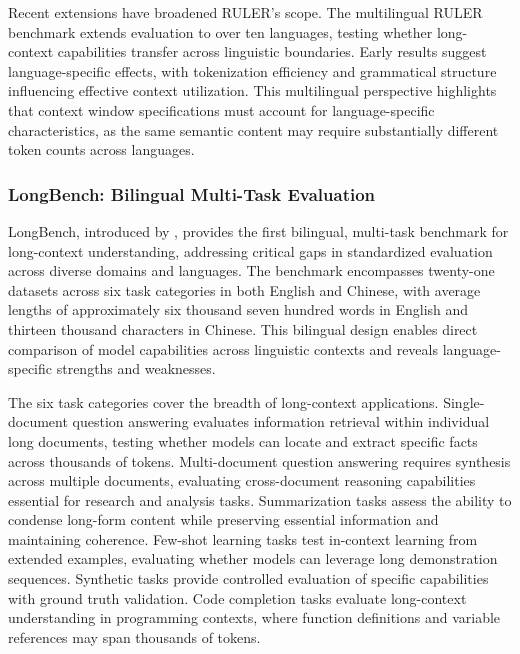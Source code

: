 Recent extensions have broadened RULER's scope. The multilingual RULER benchmark extends evaluation to over ten languages, testing whether long-context capabilities transfer across linguistic boundaries. Early results suggest language-specific effects, with tokenization efficiency and grammatical structure influencing effective context utilization. This multilingual perspective highlights that context window specifications must account for language-specific characteristics, as the same semantic content may require substantially different token counts across languages.

\subsubsection{LongBench: Bilingual Multi-Task Evaluation}

LongBench, introduced by \citet{bai2024longbench}, provides the first bilingual, multi-task benchmark for long-context understanding, addressing critical gaps in standardized evaluation across diverse domains and languages. The benchmark encompasses twenty-one datasets across six task categories in both English and Chinese, with average lengths of approximately six thousand seven hundred words in English and thirteen thousand characters in Chinese. This bilingual design enables direct comparison of model capabilities across linguistic contexts and reveals language-specific strengths and weaknesses.

The six task categories cover the breadth of long-context applications. Single-document question answering evaluates information retrieval within individual long documents, testing whether models can locate and extract specific facts across thousands of tokens. Multi-document question answering requires synthesis across multiple documents, evaluating cross-document reasoning capabilities essential for research and analysis tasks. Summarization tasks assess the ability to condense long-form content while preserving essential information and maintaining coherence. Few-shot learning tasks test in-context learning from extended examples, evaluating whether models can leverage long demonstration sequences. Synthetic tasks provide controlled evaluation of specific capabilities with ground truth validation. Code completion tasks evaluate long-context understanding in programming contexts, where function definitions and variable references may span thousands of tokens.


